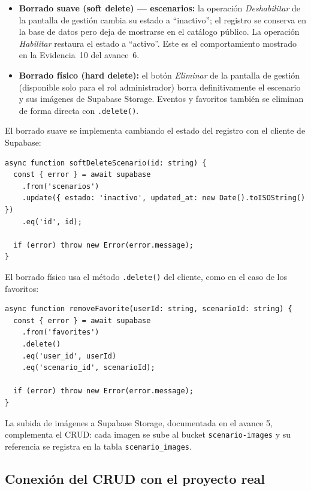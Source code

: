 \begin{itemize}
  \item \textbf{Borrado suave (soft delete) --- escenarios:} la operaci\'on
    \emph{Deshabilitar} de la pantalla de gesti\'on cambia su estado a
    ``inactivo''; el registro se conserva en la base de datos pero deja
    de mostrarse en el cat\'alogo p\'ublico. La operaci\'on
    \emph{Habilitar} restaura el estado a ``activo''. Este es el
    comportamiento mostrado en la Evidencia~10 del avance~6.
  \item \textbf{Borrado f\'isico (hard delete):} el bot\'on \emph{Eliminar}
    de la pantalla de gesti\'on (disponible solo para el rol
    administrador) borra definitivamente el escenario y sus im\'agenes de
    Supabase Storage. Eventos y favoritos tambi\'en se eliminan de forma
    directa con \texttt{.delete()}.
\end{itemize}

El borrado suave se implementa cambiando el estado del registro con el
cliente de Supabase:

\begin{lstlisting}
async function softDeleteScenario(id: string) {
  const { error } = await supabase
    .from('scenarios')
    .update({ estado: 'inactivo', updated_at: new Date().toISOString() })
    .eq('id', id);

  if (error) throw new Error(error.message);
}
\end{lstlisting}

El borrado f\'isico usa el m\'etodo \texttt{.delete()} del cliente, como
en el caso de los favoritos:

\begin{lstlisting}
async function removeFavorite(userId: string, scenarioId: string) {
  const { error } = await supabase
    .from('favorites')
    .delete()
    .eq('user_id', userId)
    .eq('scenario_id', scenarioId);

  if (error) throw new Error(error.message);
}
\end{lstlisting}

La subida de im\'agenes a Supabase Storage, documentada en el avance 5,
complementa el CRUD: cada imagen se sube al bucket \texttt{scenario-images}
y su referencia se registra en la tabla \texttt{scenario\_images}.

\subsection{Conexi\'on del CRUD con el proyecto real}

